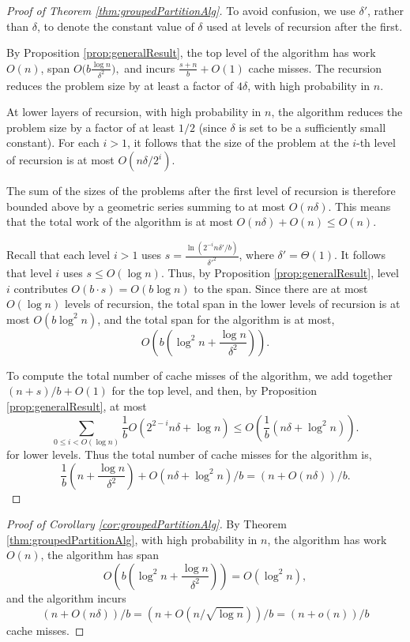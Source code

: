 \documentclass[twoside,leqno,twocolumn]{article}
\begin{document}
\begin{proof}[Proof of Theorem \ref{thm:groupedPartitionAlg}]
  To avoid confusion, we use $\delta'$, rather than $\delta$, to
  denote the constant value of $\delta$ used at levels of recursion
  after the first.
  
  
  By Proposition \ref{prop:generalResult}, the top level of the algorithm
  has work $O(n)$, span $O\Big(b\frac{\log n}{\delta^2}\Big),$ and
  incurs $\frac{s+n}{b} + O(1)$ cache misses.  The recursion reduces
  the problem size by at least a factor of $4\delta$, with high
  probability in $n$.

  At lower layers of recursion, with high probability in $n$, the
  algorithm reduces the problem size by a factor of at least
  $1/2$ (since $\delta$ is set to be a sufficiently small
  constant). For each $i > 1$, it follows that the size of the problem at the $i$-th level of recursion is at most $O(n \delta / 2^i)$.
  
  The sum of the sizes of the problems after the first level of
  recursion is therefore bounded above by a geometric series summing to at most $O(n
  \delta)$. This means that the total work of the algorithm is at most
  $O(n\delta) + O(n) \le O(n)$.

  Recall that each level $i > 1$ uses $s =
  \frac{\ln(2^{-i}n\delta'/b)}{\delta'^2}$, where $\delta' =
  \Theta(1)$. It follows that level $i$ uses $s \le O(\log n)$.  Thus,
  by Proposition \ref{prop:generalResult}, level $i$ contributes
  $O(b\cdot s)=O(b \log n)$ to the span.  Since there are at most  $O(\log n)$ levels of recursion, the total span in the lower levels
  of recursion is at most $O(b\log^2 n)$, and the total span for the
  algorithm is at most,
	$$O\left(b\left(\log^2 n + \frac{\log n}{\delta^2}\right)\right).$$
        
	To compute the total number of cache misses of the algorithm,
        we add together $(n+s)/b+O(1)$ for the top level, and then, by
        Proposition \ref{prop:generalResult}, at most
        $$\sum_{0 \leq i< O(\log n)}\frac{1}{b}
        O\left(2^{2-i}n\delta + \log n\right) \le O\left(\frac{1}{b} (n \delta + \log^2 n)\right).$$
	for lower levels.
	Thus the total number of cache misses for the algorithm is, 
	$$\frac{1}{b}\left(n+\frac{\log n}{\delta^2 }\right) + O(n\delta + \log^2 n) / b = (n+O(n\delta))/b.$$
\end{proof}

\begin{proof}[Proof of Corollary \ref{cor:groupedPartitionAlg}] By Theorem \ref{thm:groupedPartitionAlg}, with high probability in $n$, the algorithm has work $O(n)$, the algorithm has span
	$$O\left(b\left(\log^2 n + \frac{\log
    n}{\delta^2}\right)\right) = O(\log^2 n),$$ and the algorithm
  incurs
	$$(n+O(n\delta))/b = (n+O(n/\sqrt{\log n}))/b = (n+o(n))/b$$ 
	cache misses.
\end{proof}
\end{document}
